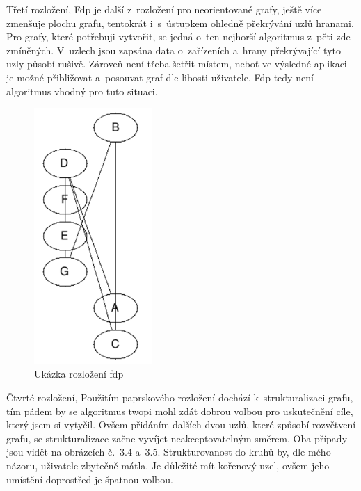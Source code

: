 \documentclass[printed,color,table,oneside,nolot,nolof]{fithesis}
\begin{document}
	Třetí rozložení, \cite{graphviz_layout} 
	Fdp je další z~rozložení pro neorientované grafy, ještě více zmenšuje plochu grafu, tentokrát i~s~ústupkem ohledně překrývání
	uzlů hranami. Pro grafy, které potřebuji vytvořit, se jedná o~ten nejhorší algoritmus z~pěti zde zmíněných. V~uzlech jsou zapsána data o~zařízeních a~hrany překrývající tyto uzly
	působí rušivě. Zároveň není třeba šetřit místem, neboť ve výsledné aplikaci je možné přibližovat a~posouvat graf dle libosti uživatele. Fdp tedy není algoritmus vhodný pro tuto
	situaci.

\begin{figure}[h!]
	\label{fig:Ukázka rozložení fdp}
	\caption{Ukázka rozložení fdp}
	\centering
	\includegraphics[width=0.4\textwidth]{pictures/fdp_example.png} 
\end{figure}

	Čtvrté rozložení, \cite{graphviz_layout}
	Použitím paprskového rozložení dochází k~strukturalizaci grafu, tím pádem by se algoritmus twopi mohl zdát 
	dobrou volbou pro uskutečnění cíle, který jsem si vytyčil. Ovšem přidáním dalších dvou uzlů, které způsobí rozvětvení grafu, se strukturalizace začne vyvíjet neakceptovatelným směrem.
	Oba případy jsou vidět na obrázcích č.~3.4 a~3.5. Strukturovanost do kruhů by, dle mého názoru, uživatele zbytečně mátla. Je důležité mít kořenový uzel, ovšem jeho umístění doprostřed je špatnou
	volbou.
\end{document}

